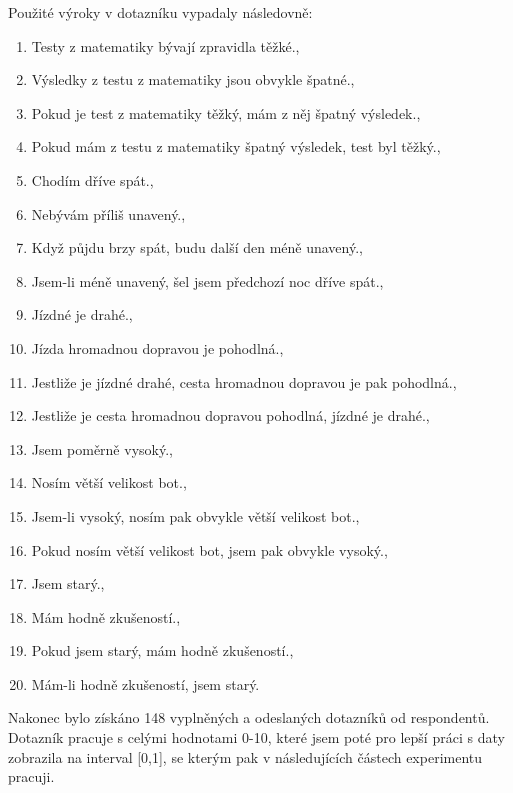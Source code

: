 Použité výroky v dotazníku vypadaly následovně:
\begin{enumerate}
       \item  \clqq Testy z matematiky bývají zpravidla těžké.\crqq  , 
       \item  \clqq Výsledky z testu z matematiky jsou obvykle špatné.\crqq  ,
       \item  \clqq Pokud je test z matematiky těžký, mám z něj špatný výsledek.\crqq  ,
       \item  \clqq Pokud mám z testu z matematiky špatný výsledek, test byl těžký.\crqq  ,
       \item  \clqq Chodím dříve spát.\crqq  ,
       \item  \clqq Nebývám příliš unavený.\crqq  ,
       \item  \clqq Když půjdu brzy spát, budu další den méně unavený.\crqq  ,
       \item  \clqq Jsem-li méně unavený, šel jsem předchozí noc dříve spát.\crqq  ,
       \item  \clqq Jízdné je drahé.\crqq  ,
       \item  \clqq Jízda hromadnou dopravou je pohodlná.\crqq  ,
       \item  \clqq Jestliže je jízdné drahé, cesta hromadnou dopravou je pak pohodlná.\crqq,
       \item  \clqq Jestliže je cesta hromadnou dopravou pohodlná, jízdné je drahé.\crqq  ,
       \item  \clqq Jsem poměrně vysoký.\crqq  ,
       \item  \clqq Nosím větší velikost bot.\crqq  ,
       \item  \clqq Jsem-li vysoký, nosím pak obvykle větší velikost bot.\crqq  ,
       \item  \clqq Pokud nosím větší velikost bot, jsem pak obvykle vysoký.\crqq  ,
       \item  \clqq Jsem starý.\crqq,
       \item  \clqq Mám hodně zkušeností.\crqq,
       \item  \clqq Pokud jsem starý, mám hodně zkušeností.\crqq,
       \item  \clqq Mám-li hodně zkušeností, jsem starý.\crqq 
\end{enumerate}

Nakonec bylo získáno 148 vyplněných a odeslaných dotazník\r u od respondent\r u. Dotazník pracuje s celými hodnotami 0-10, které jsem poté pro lepší práci s daty zobrazila na interval [0,1], se kterým pak v následujících částech experimentu pracuji.

